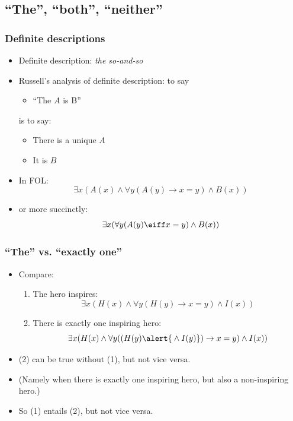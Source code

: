 \newhourlecture

\subsection{``The'', ``both'', ``neither''}

\begin{frame}
    \frametitle{Definite descriptions}

\begin{itemize}[<+->]
\item Definite description: \emph{the so-and-so}
\item Russell's analysis of definite description: to say\\
\begin{itemize}[<+->]
\item ``The $A$ is B''\\
\end{itemize}
is to say:
\begin{itemize}[<+->]
\item There is a unique $A$
\item It is $B$
\end{itemize}
\item In FOL:
\[
\exists x(A(x) \land \forall y(A(y) \to x = y) \land B(x))
\]
\item or more succinctly:
\[
\exists x(\forall y(A(y) \eiff x = y) \land B(x))
\]
\end{itemize}
\end{frame}

\begin{frame}
\frametitle{``The'' vs. ``exactly one''}

\begin{itemize}[<+->]
\item Compare:
\begin{enumerate}[<+->]
\item The hero inspires:
\[\exists x(H(x) \land \forall y(H(y) \to x = y) \land I(x))\]
\item There is exactly one inspiring hero:
\[\exists x(H(x) \land \forall y((H(y) \alert{{}\land I(y)}) \to x = y) \land I(x))\]
\end{enumerate}
\item (2) can be true without (1), but not vice versa.
\item (Namely when there is exactly one inspiring hero, but also a non-inspiring hero.)
\item So (1) entails (2), but not vice versa.
\end{itemize}
\end{frame}

